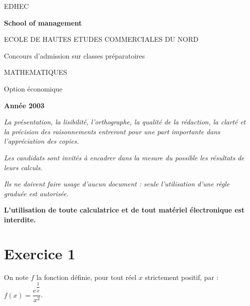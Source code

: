 \documentclass[11pt]{article}%
\begin{document}
\begin{center}
{\Huge EDHEC}

\textbf{School of management\vspace{3cm}}

{\large ECOLE DE HAUTES ETUDES COMMERCIALES DU NORD}

{\large Concours d'admission sur classes préparatoires}

\underline{\hspace{3cm}}

{\LARGE MATHEMATIQUES}

{\large Option économique}

\textbf{Année 2003}{\large }
\end{center}

\noindent \textsl{La présentation, la lisibilité, l'orthographe, la
qualité
de la rédaction, la clarté et la précision des raisonnements entreront
pour
une part importante dans l'appréciation des copies.}

\noindent \textsl{Les candidats sont invités à encadrer dans la mesure
du
possible les résultats de leurs calculs.}

\noindent \textsl{Ils ne doivent faire usage d'aucun document : seule
l'utilisation d'une règle graduée est autorisée.\vspace{1cm}}

\noindent \textbf{L'utilisation de toute calculatrice et de tout
matériel électronique est interdite.}\vspace{1cm}

\section*{Exercice 1}

On note $f$ la fonction définie, pour tout réel $x$ strictement
positif, par : $f\left( x\right) = \dfrac{e^{\dfrac{1}{x}}}{x^{2}}$.
\end{document}
